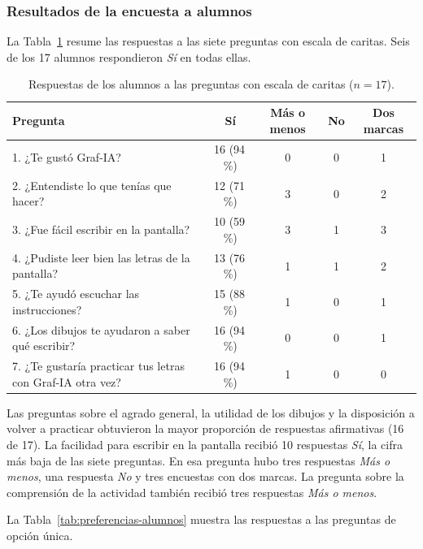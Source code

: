 \subsubsection{Resultados de la encuesta a alumnos}
\label{sec:resultados-alumnos}

La Tabla~\ref{tab:resultados-alumnos} resume las respuestas a las siete preguntas con escala de caritas. Seis de los 17 alumnos respondieron \textit{Sí} en todas ellas.

\begin{table}[H]
\centering
\caption{Respuestas de los alumnos a las preguntas con escala de caritas ($n=17$).}
\label{tab:resultados-alumnos}
\renewcommand{\arraystretch}{1.3}
\begin{tabular}{|p{6.4cm}|c|c|c|c|}
\hline
\textbf{Pregunta} & \textbf{Sí} & \textbf{Más o menos} & \textbf{No} & \textbf{Dos marcas} \\ \hline
1. ¿Te gustó Graf-IA? & 16 (94\,\%) & 0 & 0 & 1 \\ \hline
2. ¿Entendiste lo que tenías que hacer? & 12 (71\,\%) & 3 & 0 & 2 \\ \hline
3. ¿Fue fácil escribir en la pantalla? & 10 (59\,\%) & 3 & 1 & 3 \\ \hline
4. ¿Pudiste leer bien las letras de la pantalla? & 13 (76\,\%) & 1 & 1 & 2 \\ \hline
5. ¿Te ayudó escuchar las instrucciones? & 15 (88\,\%) & 1 & 0 & 1 \\ \hline
6. ¿Los dibujos te ayudaron a saber qué escribir? & 16 (94\,\%) & 0 & 0 & 1 \\ \hline
7. ¿Te gustaría practicar tus letras con Graf-IA otra vez? & 16 (94\,\%) & 1 & 0 & 0 \\ \hline
\end{tabular}
\end{table}

Las preguntas sobre el agrado general, la utilidad de los dibujos y la disposición a volver a practicar obtuvieron la mayor proporción de respuestas afirmativas (16 de 17). La facilidad para escribir en la pantalla recibió 10 respuestas \textit{Sí}, la cifra más baja de las siete preguntas. En esa pregunta hubo tres respuestas \textit{Más o menos}, una respuesta \textit{No} y tres encuestas con dos marcas. La pregunta sobre la comprensión de la actividad también recibió tres respuestas \textit{Más o menos}.

La Tabla~\ref{tab:preferencias-alumnos} muestra las respuestas a las preguntas de opción única.

